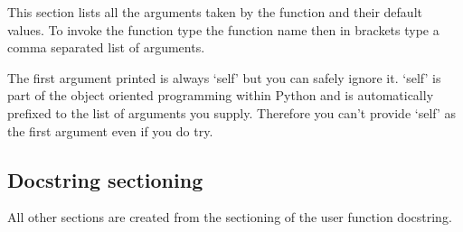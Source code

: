 This section lists all the arguments taken by the function and their default values.
To invoke the function type the function name then in brackets type a comma separated list of arguments.

The first argument printed is always `self' but you can safely ignore it.
`self' is part of the object oriented programming within Python and is automatically prefixed to the list of arguments you supply.
Therefore you can't provide `self' as the first argument even if you do try.


\subsection{Docstring sectioning}

All other sections are created from the sectioning of the user function docstring.


\begin{latexonly}
   \newpage
   \raggedbottom
   \twocolumn
   {\scriptsize
   
   }
   \onecolumn
\end{latexonly}
\begin{htmlonly}
   
\end{htmlonly}
